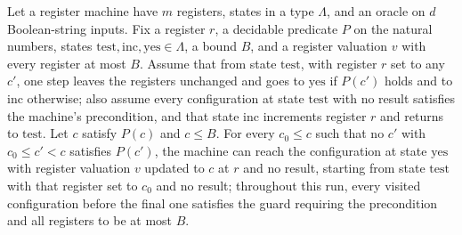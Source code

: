 \begin{theorem}
\label{Complexity.LogProg.searchUp_run}
\leanok
{}
Let a register machine have $m$ registers, states in a type $\Lambda$, and an oracle on
$d$ Boolean-string inputs. Fix a register $r$, a decidable predicate $P$ on the natural
numbers, states $\mathrm{test},\mathrm{inc},\mathrm{yes}\in\Lambda$, a bound $B$, and a
register valuation $v$ with every register at most $B$. Assume that from state
$\mathrm{test}$, with register $r$ set to any $c'$, one step leaves the registers
unchanged and goes to $\mathrm{yes}$ if $P(c')$ holds and to $\mathrm{inc}$ otherwise;
also assume every configuration at state $\mathrm{test}$ with no result satisfies the
machine's precondition, and that state $\mathrm{inc}$ increments register $r$ and
returns to $\mathrm{test}$. Let $c$ satisfy $P(c)$ and $c\le B$. For every $c_0\le c$
such that no $c'$ with $c_0\le c'<c$ satisfies $P(c')$, the machine can reach the
configuration at state $\mathrm{yes}$ with register valuation $v$ updated to $c$ at $r$
and no result, starting from state $\mathrm{test}$ with that register set to $c_0$ and
no result; throughout this run, every visited configuration before the final one
satisfies the guard requiring the precondition and all registers to be at most $B$.
\end{theorem}

